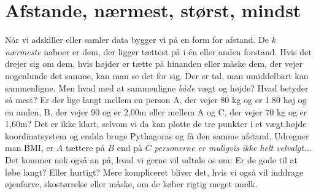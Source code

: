 \documentclass[a4paper, 12pt]{article}
\theoremstyle{remark}
\begin{document}
\section*{Afstande, nærmest, størst, mindst}
Når vi adskiller eller samler data bygger vi på en form for afstand. De $k$ \emph{ nærmeste} naboer er dem, der ligger tættest på i én eller anden forstand. 
Hvis det drejer sig om dem, hvis højder er tætte på hinanden eller måske dem, der vejer nogenlunde det samme, kan man se det for sig. 
Der er tal, man umiddelbart kan sammenligne. Men hvad med at sammenligne \emph{både} vægt og højde? Hvad betyder så mest? 
Er der lige langt mellem en person A, der vejer 80 kg og er 1.80 høj og en anden, B,  der vejer 90 og er 2,00m eller mellem A og C, der vejer 70 kg og er 1,60m? 
Det er ikke klart, selvom vi da kan plotte de tre punkter i et vægt,højde koordinatsystem og endda bruge Pythagoras og få den samme afstand. 
Udregner man BMI, er $A$ tættere på $B$ end på $C$  \emph{personerne er muligvis ikke helt velvalgt...}
Det kommer nok også an på, hvad vi gerne vil udtale os om: Er de gode til at løbe langt? Eller hurtigt? Mere kompliceret bliver det, hvis vi også vil inddrage øjenfarve, skostørrelse eller måske, om de køber rigtig meget mælk.
\end{document}
